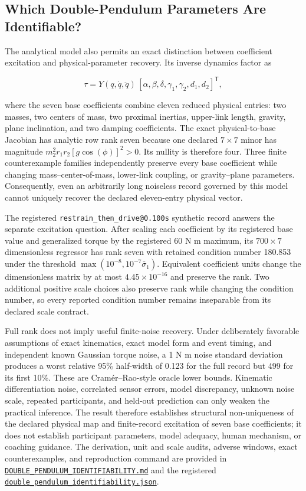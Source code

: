 \documentclass[
  letterpaper,
]{report}
\begin{document}
\subsection{Which Double-Pendulum Parameters Are
Identifiable?}\label{sec-double-pendulum-identifiability}

The analytical model also permits an exact distinction between
coefficient excitation and physical-parameter recovery. Its inverse
dynamics factor as

\[
\tau=Y(q,\dot q,\ddot q)\,
[\alpha,\beta,\delta,\gamma_1,\gamma_2,d_1,d_2]^\mathsf{T},
\]

where the seven base coefficients combine eleven reduced physical
entries: two masses, two centers of mass, two proximal inertias,
upper-link length, gravity, plane inclination, and two damping
coefficients. The exact physical-to-base Jacobian has analytic row rank
seven because one declared \(7\times7\) minor has magnitude
\(m_2^2r_1r_2[g\cos(\phi)]^2>0\). Its nullity is therefore four. Three
finite counterexample families independently preserve every base
coefficient while changing mass--center-of-mass, lower-link coupling, or
gravity--plane parameters. Consequently, even an arbitrarily long
noiseless record governed by this model cannot uniquely recover the
declared eleven-entry physical vector.

The registered \texttt{restrain\_then\_drive@0.100s} synthetic record
answers the separate excitation question. After scaling each coefficient
by its registered base value and generalized torque by the registered 60
N m maximum, its \(700\times7\) dimensionless regressor has rank seven
with retained condition number 180.853 under the threshold
\(\max(10^{-8},10^{-7}\bar\sigma_1)\). Equivalent coefficient units
change the dimensionless matrix by at most \(4.45\times10^{-16}\) and
preserve the rank. Two additional positive scale choices also preserve
rank while changing the condition number, so every reported condition
number remains inseparable from its declared scale contract.

Full rank does not imply useful finite-noise recovery. Under
deliberately favorable assumptions of exact kinematics, exact model form
and event timing, and independent known Gaussian torque noise, a 1 N m
noise standard deviation produces a worst relative 95\% half-width of
0.123 for the full record but 499 for its first 10\%. These are
Cramér--Rao-style oracle lower bounds. Kinematic differentiation noise,
correlated sensor errors, model discrepancy, unknown noise scale,
repeated participants, and held-out prediction can only weaken the
practical inference. The result therefore establishes structural
non-uniqueness of the declared physical map and finite-record excitation
of seven base coefficients; it does not establish participant
parameters, model adequacy, human mechanism, or coaching guidance. The
derivation, unit and scale audits, adverse windows, exact
counterexamples, and reproduction command are provided in
\href{../DOUBLE_PENDULUM_IDENTIFIABILITY.md}{\texttt{DOUBLE\_PENDULUM\_IDENTIFIABILITY.md}}
and the registered
\href{../data/double_pendulum_identifiability.json}{\texttt{double\_pendulum\_identifiability.json}}.
\end{document}
